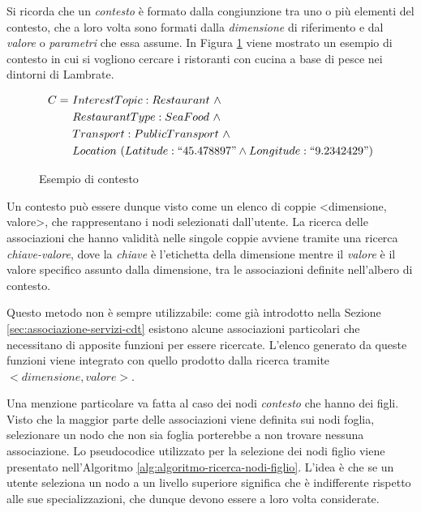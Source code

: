 Si ricorda che un \emph{contesto} è formato dalla congiunzione tra uno o più elementi del contesto, che a loro volta sono formati dalla \emph{dimensione} di riferimento e dal \emph{valore} o \emph{parametri} che essa assume. In Figura \ref{fig:esempio-contesto} viene mostrato un esempio di contesto in cui si vogliono cercare i ristoranti con cucina a base di pesce nei dintorni di Lambrate.

\begin{figure}[ht]
	\begin{align*}
		C =\ &InterestTopic : Restaurant\ \land \\
		&RestaurantType : SeaFood\ \land \\
		&Transport : PublicTransport\ \land \\
		&Location\ (Latitude : ``45.478897" \land Longitude : ``9.2342429")
	\end{align*}
	\caption{Esempio di contesto\label{fig:esempio-contesto}}
\end{figure}

Un contesto può essere dunque visto come un elenco di coppie {<}dimensione, valore{>}, che rappresentano i nodi selezionati dall'utente. La ricerca delle associazioni che hanno validità nelle singole coppie avviene tramite una ricerca \emph{chiave-valore}, dove la \emph{chiave} è l'etichetta della dimensione mentre il \emph{valore} è il valore specifico assunto dalla dimensione, tra le associazioni definite nell'albero di contesto.

Questo metodo non è sempre utilizzabile: come già introdotto nella Sezione \ref{sec:associazione-servizi-cdt} esistono alcune associazioni particolari che necessitano di apposite funzioni per essere ricercate. L'elenco generato da queste funzioni viene integrato con quello prodotto dalla ricerca tramite $ {<}dimensione, valore{>} $.

Una menzione particolare va fatta al caso dei nodi \emph{contesto} che hanno dei figli. Visto che la maggior parte delle associazioni viene definita sui nodi foglia, selezionare un nodo che non sia foglia porterebbe a non trovare nessuna associazione. Lo pseudocodice utilizzato per la selezione dei nodi figlio viene presentato nell'Algoritmo \ref{alg:algoritmo-ricerca-nodi-figlio}. L'idea è che se un utente seleziona un nodo a un livello superiore significa che è indifferente rispetto alle sue specializzazioni, che dunque devono essere a loro volta considerate.

